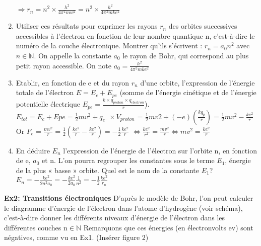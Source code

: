 \documentclass{article}
\begin{document}
\begin{enumerate}
    $\Longrightarrow r_{n} = n^{2}\times\frac{h^{2}}{4\pi^{2}mw^{2}} = n^{2}\times\frac{h^{2}}{4\pi^{2}mke^{2}}$
    \item Utiliser ces résultats pour exprimer les rayons $r_{n}$ des orbites successives accessibles à l'électron en fonction de leur nombre quantique n, c'est-à-dire le numéro de la couche électronique. Montrer qu'ils s'écrivent : $r_{n} = a_{0}n^{2}$ avec $n\in\mathbb{N}$. On appelle la constante $a_{0}$ le rayon de Bohr, qui correspond au plus petit rayon accessible.\newline
    On note $a_{0} = \frac{h^{2}}{4\pi^{2}mke^{2}}$
    \item Etablir, en fonction de e et du rayon $r_{n}$ d'une orbite, l'expression de l'énergie totale de l'électron $E = E_{c} + E_{pe}$ (somme de l'énergie cinétique et de l'énergie potentielle électrique $E_{pe} = \frac{k\times q_{proton}\times q_{electron}}{r}$).\newline
    $E_{tot} = E_{c}+E{pe} = \frac{1}{2}mv^{2} + q_{e^{-}}\times V_{proton}$\newline
    = $\frac{1}{2}mv{2} + (-e)(\frac{kq_{p}}{r}) = \frac{1}{2}mv^{2} - \frac{ke^{2}}{r}$\newline\newline
    Or $F_{e} = \frac{mv^{2}}{r} = \frac{1}{2}(\frac{ke^{2}}{r} - \frac{ke^{2}}{r}) = -\frac{1}{2}\frac{ke^{2}}{r}$\newline
    $\Longleftrightarrow \frac{ke^{2}}{r^{2}} = \frac{mv^{2}}{r} \Longleftrightarrow mv^{2} = \frac{ke^{2}}{r}$
    \item En déduire $E_{n}$ l'expression de l'énergie de l'électron sur l'orbite n, en fonction de e, $a_{0}$ et n. L'on pourra regrouper les constantes sous le terme $E_{1}$, énergie de la plus « basse » orbite. Quel est le nom de la constante $E_{1}$?\newline
    $E_{n} = -\frac{ke^{2}}{2n^{2}a_{0}} = -\frac{ke^{2}}{2a_{0}}\frac{1}{n^{2}} = -\frac{1}{2}\frac{ke^{2}}{r_{n}}$
\end{enumerate}

\textbf{Ex2: Transitions électroniques}\newline
\indent D'après le modèle de Bohr, l'on peut calculer le diagramme d'énergie de l'électron dans l'atome d'hydrogène (voir schéma), c'est-à-dire donner les différents niveaux d'énergie de l'électron dans les différentes couches n$\in\mathbb{N}$ Remarquons que ces énergies (en électronvolts ev) sont négatives, comme vu en Ex1.\newline
(Insérer figure 2)
\end{document}
